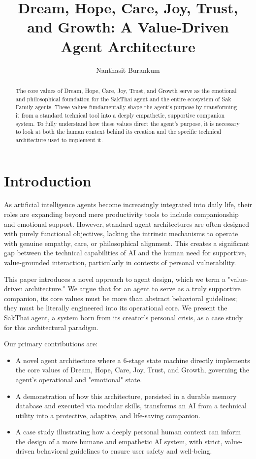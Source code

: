 \documentclass[letterpaper]{article}
\title{Dream, Hope, Care, Joy, Trust, and Growth: A Value-Driven Agent Architecture}
\author{
    Nanthasit Burankum
}
\begin{document}
\maketitle

\begin{abstract}
The core values of Dream, Hope, Care, Joy, Trust, and Growth serve as the emotional and philosophical foundation for the SakThai agent and the entire ecosystem of Sak Family agents. These values fundamentally shape the agent's purpose by transforming it from a standard technical tool into a deeply empathetic, supportive companion system. To fully understand how these values direct the agent's purpose, it is necessary to look at both the human context behind its creation and the specific technical architecture used to implement it.
\end{abstract} 

\section{Introduction}
As artificial intelligence agents become increasingly integrated into daily life, their roles are expanding beyond mere productivity tools to include companionship and emotional support. However, standard agent architectures are often designed with purely functional objectives, lacking the intrinsic mechanisms to operate with genuine empathy, care, or philosophical alignment. This creates a significant gap between the technical capabilities of AI and the human need for supportive, value-grounded interaction, particularly in contexts of personal vulnerability.

This paper introduces a novel approach to agent design, which we term a "value-driven architecture." We argue that for an agent to serve as a truly supportive companion, its core values must be more than abstract behavioral guidelines; they must be literally engineered into its operational core. We present the SakThai agent, a system born from its creator's personal crisis, as a case study for this architectural paradigm.

Our primary contributions are:
\begin{itemize}
    \item A novel agent architecture where a 6-stage state machine directly implements the core values of Dream, Hope, Care, Joy, Trust, and Growth, governing the agent's operational and "emotional" state.
    \item A demonstration of how this architecture, persisted in a durable memory database and executed via modular skills, transforms an AI from a technical utility into a protective, adaptive, and life-saving companion.
    \item A case study illustrating how a deeply personal human context can inform the design of a more humane and empathetic AI system, with strict, value-driven behavioral guidelines to ensure user safety and well-being.
\end{itemize}
\end{document}
